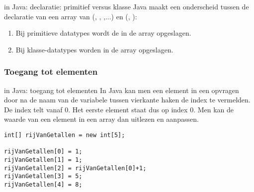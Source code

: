 \begin{frame}[fragile]{\dsarray{} in Java: declaratie: primitief versus klasse}
Java maakt een onderscheid tussen de declaratie van een array van  (\dsint{}, \dsfloat{}, \dslong{},...) en  (\dsobject{}, \dsstring{}):
\begin{enumerate}
 \item Bij primitieve datatypes wordt de  in de array opgeslagen.
 \begin{figure}[H]
 \centering
 \end{figure}
 \item Bij klasse-datatypes worden  in de array opgeslagen.
 \begin{figure}[H]
 \centering
 \end{figure}
\end{enumerate}
\end{frame}
\subsubsection{Toegang tot elementen}
\begin{frame}[fragile]{\dsarray{} in Java: toegang tot elementen}
In Java kan men een element in een \dsarray{} opvragen door na de naam van de variabele tussen vierkante haken de index te vermelden. De index telt vanaf 0. Het eerste element staat dus op index 0. Men kan de waarde van een element in een array dan uitlezen en aanpassen.
\begin{example}
\begin{lstlisting}
int[] rijVanGetallen = new int[5];

rijVanGetallen[0] = 1;
rijVanGetallen[1] = 1;
rijVanGetallen[2] = rijVanGetallen[0]+1;
rijVanGetallen[3] = 5;
rijVanGetallen[4] = 8;
\end{lstlisting}
\end{example}
\end{frame}
